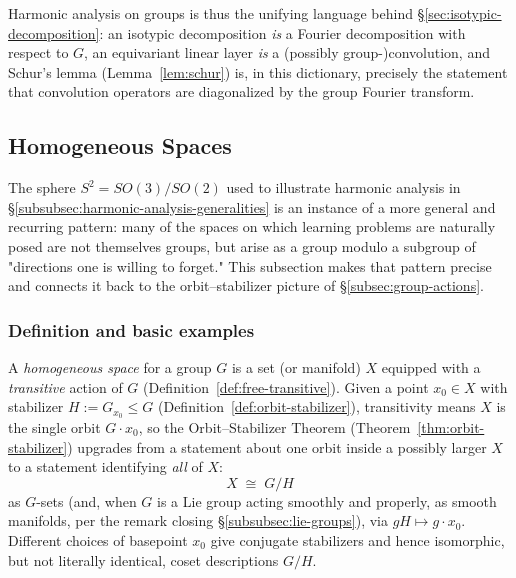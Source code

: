 \documentclass[mathematics,review,submit,moreauthors]{Definitions/mdpi}
\begin{document}
Harmonic analysis on groups is thus the unifying language behind
\S\ref{sec:isotypic-decomposition}: an isotypic decomposition
\emph{is} a Fourier decomposition with respect to $G$, an equivariant linear
layer \emph{is} a (possibly group-)convolution, and Schur's lemma
(Lemma~\ref{lem:schur}) is, in this dictionary, precisely the statement that
convolution operators are diagonalized by the group Fourier transform.



\subsection{Homogeneous Spaces}
\label{subsec:homogeneous-spaces}

The sphere $S^2 = SO(3)/SO(2)$ used to illustrate harmonic analysis in
\S\ref{subsubsec:harmonic-analysis-generalities} is an instance of a more
general and recurring pattern: many of the spaces on which learning problems
are naturally posed are not themselves groups, but arise as a group modulo
a subgroup of "directions one is willing to forget." This subsection makes
that pattern precise and connects it back to the orbit--stabilizer picture
of \S\ref{subsec:group-actions}.

\subsubsection{Definition and basic examples}
\label{subsubsec:homogeneous-spaces-def}

\begin{Definition}
\label{def:homogeneous-space}
A \emph{homogeneous space} for a group $G$ is a set (or manifold) $X$
equipped with a \emph{transitive} action of $G$
(Definition~\ref{def:free-transitive}). Given a point $x_0 \in X$ with
stabilizer $H := G_{x_0} \leq G$ (Definition~\ref{def:orbit-stabilizer}),
transitivity means $X$ is the single orbit $G \cdot x_0$, so the
Orbit--Stabilizer Theorem (Theorem~\ref{thm:orbit-stabilizer}) upgrades from
a statement about one orbit inside a possibly larger $X$ to a statement
identifying \emph{all} of $X$:
\[
    X \;\cong\; G / H
\]
as $G$-sets (and, when $G$ is a Lie group acting smoothly and properly, as
smooth manifolds, per the remark closing
\S\ref{subsubsec:lie-groups}), via $gH \mapsto g \cdot x_0$. Different choices
of basepoint $x_0$ give conjugate stabilizers and hence isomorphic, but not
literally identical, coset descriptions $G/H$.
\end{Definition}
\end{document}
